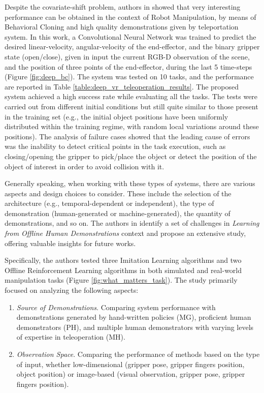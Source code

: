 Despite the covariate-shift problem, authors in \cite{zhang2018deep_vr_teleoperation} showed that very interesting performance can be obtained in the context of Robot Manipulation, by means of Behavioral Cloning and high quality demonstrations given by teleportation system. In this work, a Convolutional Neural Network was trained to predict the desired linear-velocity, angular-velocity of the end-effector, and the binary gripper state (open/close), given in input the current RGB-D observation of the scene, and the position of three points of the end-effector, during the last 5 time-steps (Figure \ref{fig:deep_bc}). The system was tested on 10 tasks, and the performance are reported in Table \ref{table:deep_vr_teleoperation_results}. The proposed system achieved a high success rate while evaluating all the tasks. The tests were carried out from different initial conditions but still quite similar to those present in the training set (e.g., the initial object positions have been uniformly distributed within the training regime, with random local variations around these positions). The analysis of failure cases showed that the leading cause of errors was the inability to detect critical points in the task execution, such as closing/opening the gripper to pick/place the object or detect the position of the object of interest in order to avoid collision with it.


Generally speaking, when working with these types of systems, there are various aspects and design choices to consider. These include the selection of the architecture (e.g., temporal-dependent or independent), the type of demonstration (human-generated or machine-generated), the quantity of demonstrations, and so on. The authors in \cite{mandlekar2022matters} identify a set of challenges in \textit{Learning from Offline Human Demonstrations} context and propose an extensive study, offering valuable insights for future works.

Specifically, the authors tested three Imitation Learning algorithms and two Offline Reinforcement Learning algorithms in both simulated and real-world manipulation tasks (Figure \ref{fig:what_matters_task}). The study primarily focused on analyzing the following aspects:

\begin{enumerate}
    \item \textit{Source of Demonstrations}. Comparing system performance with demonstrations generated by hand-written policies (MG), proficient human demonstrators (PH), and multiple human demonstrators with varying levels of expertise in teleoperation (MH).
    \item \textit{Observation Space}. Comparing the performance of methods based on the type of input, whether low-dimensional (gripper pose, gripper fingers position, object position) or image-based (visual observation, gripper pose, gripper fingers position).
\end{enumerate}


